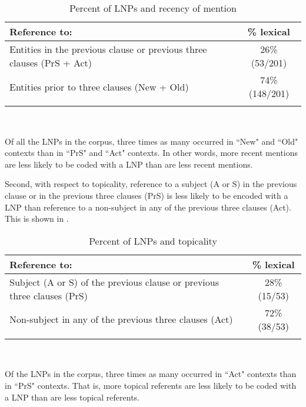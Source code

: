 \begin{table} 

\caption{{Percent of LNPs and recency of mention}}
\begin{tabularx}{\textwidth}{Qc }
\lsptoprule
 Reference to: & {\%} lexical \\

\midrule
Entities in the previous clause or previous three clauses (PrS + Act) & 26{\%} (53/201) \\ 

 
Entities prior to three clauses (New + Old) & 74{\%} (148/201) \\ 

\lspbottomrule 
\end{tabularx}\\
\label{recency}

\end{table}

Of all the LNPs in the corpus, three times as many occurred in ``New" and ``Old" contexts than in ``PrS" and ``Act" contexts. In other words, more recent mentions are less likely to be coded with a LNP than are less recent mentions.

Second, with respect to topicality, reference to a subject (A or S) in the previous clause or in the previous three clauses (PrS) is less likely to be encoded with a LNP than reference to a non-subject in any of the previous three clauses (Act). This is shown in .
\begin{table} 

\caption{{Percent of LNPs and topicality}}
\begin{tabularx}{\textwidth}{Qc }
\midrule
 Reference to: & {\%} lexical \\

\midrule
Subject (A or S) of the previous clause or previous three clauses (PrS) & 28{\%} (15/53)  \\ 

 
Non-subject in any of the previous  three clauses (Act) & 72{\%} (38/53) \\ 

\lspbottomrule
\end{tabularx}\\
\label{topicality}

\end{table}
Of the LNPs in the corpus, three times as many occurred in ``Act" contexts than in  ``PrS" contexts. That is, more topical referents are less likely to be coded with a LNP than are less topical referents. 

